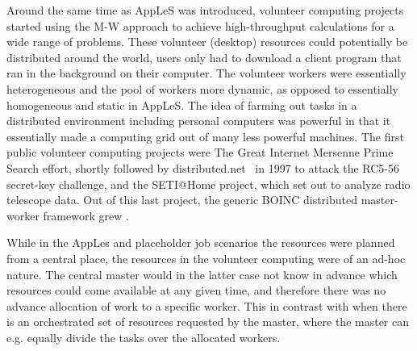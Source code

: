 \documentclass{sig-alternate}
\begin{document}
Around the same time as AppLeS was introduced, volunteer computing
projects started using the M-W approach to achieve high-throughput calculations
for a wide range of problems.
These volunteer (desktop) resources could potentially be distributed around the
world, users only had to download a client program that ran in the
background on their computer.
The volunteer workers were essentially heterogeneous and the pool of workers
more dynamic, as opposed to essentially homogeneous and static in AppLeS.
The idea of farming out tasks in a distributed environment including personal
computers was powerful in that it essentially made a computing grid out of many
less powerful machines.
The first public volunteer computing projects were The Great Internet Mersenne
Prime Search effort\cite{woltman:2004:gimps}, shortly followed by
distributed.net~\cite{Lawton:2000:distributednet} in 1997 to attack the RC5-56
secret-key challenge, and the SETI@Home project, which set out to analyze radio
telescope data.
Out of this last project, the generic BOINC distributed master-worker framework
grew \cite{Anderson:2004:BSP:1032646.1033223}.

While in the AppLes and placeholder job scenarios the resources were planned
from a central place, the resources in the volunteer computing were of an
ad-hoc nature.
The central master would in the latter case not know in advance which resources
could come available at any given time, and therefore there was no advance
allocation of work to a specific worker.
This in contrast with when there is an orchestrated set of resources requested
by the master, where the master can e.g. equally divide the tasks
over the allocated workers.
\end{document}
